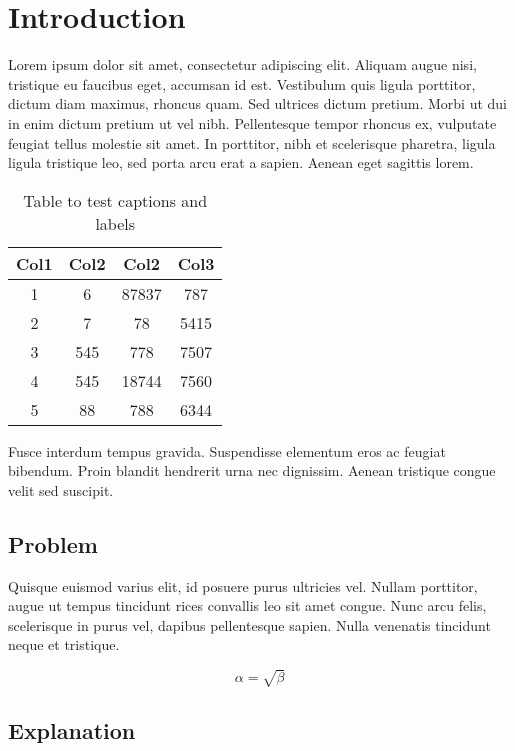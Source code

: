 \chapter{Introduction}

Lorem ipsum dolor sit amet, consectetur adipiscing elit. Aliquam augue nisi,
tristique eu faucibus eget, accumsan id est. Vestibulum quis ligula porttitor,
dictum diam maximus, rhoncus quam. Sed ultrices dictum pretium. Morbi ut dui in
enim dictum pretium ut vel nibh. Pellentesque tempor rhoncus ex, vulputate
feugiat tellus molestie sit amet. In porttitor, nibh et scelerisque pharetra,
ligula ligula tristique leo, sed porta arcu erat a sapien. Aenean eget sagittis
lorem.

\begin{table}[h!]
    \centering
    \begin{tabular}{|c c c c|}
        \hline
        Col1 & Col2 & Col2 & Col3 \\
        \hline
        1 & 6 & 87837 & 787 \\
        2 & 7 & 78 & 5415 \\
        3 & 545 & 778 & 7507 \\
        4 & 545 & 18744 & 7560 \\
        5 & 88 & 788 & 6344 \\
        \hline
    \end{tabular}
    \caption{Table to test captions and labels}
    \label{table}
\end{table}

Fusce interdum tempus gravida. Suspendisse elementum eros ac feugiat bibendum.
Proin blandit hendrerit urna nec dignissim. Aenean tristique congue velit sed
suscipit.

\section{Problem}

Quisque euismod varius elit, id posuere purus ultricies vel. Nullam porttitor,
augue ut tempus tincidunt rices convallis leo sit amet congue. Nunc arcu felis,
scelerisque in purus vel, dapibus pellentesque sapien. Nulla venenatis
tincidunt neque et tristique.

\begin{equation}
    \label{simple_equation}
    \alpha = \sqrt{ \beta }
\end{equation}

\section{Explanation}

